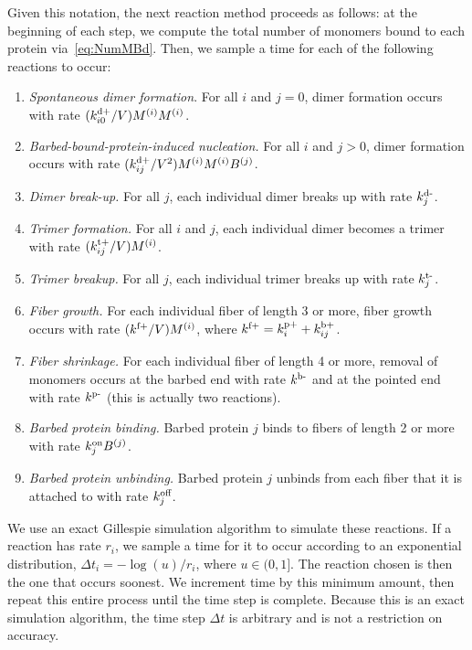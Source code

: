 \documentclass[11pt]{article}
\renewcommand{\i}[1]{{#1}^{(i)}}
\renewcommand{\j}[1]{{#1}^{(j)}}
\newcommand{\z}[1]{{#1}^{(0)}}
\begin{document}
\begin{appendices}
Given this notation, the next reaction method proceeds as follows: at the beginning of each step, we compute the total number of monomers bound to each protein via\ \eqref{eq:NumMBd}. Then, we sample a time for each of the following reactions to occur:
\begin{enumerate}
\item \emph{Spontaneous dimer formation}. For all $i$ and $j=0$, dimer formation occurs with rate $(\kdp_{i0}/V)\i M \i M$. %
\item \emph{Barbed-bound-protein-induced nucleation.} For all $i$ and $j> 0$, dimer formation occurs with rate $(\kdp_{ij}/V^2)\i M \i M \j B$. %
\item \emph{Dimer break-up.} For all $j$, each individual dimer breaks up with rate $k^\text{d-}_j$. %
\item \emph{Trimer formation.} For all $i$ and $j$, each individual dimer becomes a trimer with rate $(\ktrp_{ij}/V)\i M$.
\item \emph{Trimer breakup.} For all $j$, each individual trimer breaks up with rate $k^\text{t-}_j$.
\item \emph{Fiber growth.} For each individual fiber of length 3 or more, fiber growth occurs with rate $(\kfp/V) \i M$, where $k^\text{f+}=k^\text{p+}_i+k^\text{b+}_{ij}$.
\item \emph{Fiber shrinkage.} For each individual fiber of length 4 or more, removal of monomers occurs at the barbed end with rate $k^\text{b-}$ and at the pointed end with rate $k^\text{p-}$ (this is actually two reactions). 
\item \emph{Barbed protein binding.} Barbed protein $j$ binds to fibers of length 2 or more with rate $\kon_j  \j B$. 
\item \emph{Barbed protein unbinding.} Barbed protein $j$ unbinds from each fiber that it is attached to with rate $k^\text{off}_j$.
\end{enumerate}
We use an exact Gillespie simulation algorithm \cite{gillespie2007stochastic} to simulate these reactions. If a reaction has rate $r_i$, we sample a time for it to occur according to an exponential distribution, $\Delta t_i=-\log(u)/r_i$, where $u \in (0,1]$. The reaction chosen is then the one that occurs soonest. We increment time by this minimum amount, then repeat this entire process until the time step is complete. Because this is an exact simulation algorithm, the time step $\Delta t$ is arbitrary and is not a restriction on accuracy.


\end{appendices}
\end{document}
